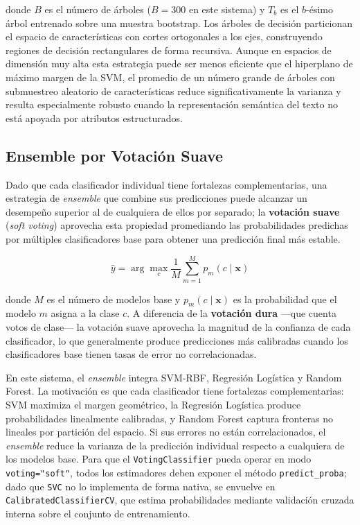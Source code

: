donde $B$ es el número de árboles ($B = 300$ en este sistema) y $T_b$ es el
$b$-ésimo árbol entrenado sobre una muestra bootstrap. Los árboles de decisión
particionan el espacio de características con cortes ortogonales a los ejes,
construyendo regiones de decisión rectangulares de forma recursiva. Aunque en
espacios de dimensión muy alta esta estrategia puede ser menos eficiente que el
hiperplano de máximo margen de la SVM, el promedio de un número grande de árboles
con submuestreo aleatorio de características reduce significativamente la varianza
y resulta especialmente robusto cuando la representación semántica del texto no
está apoyada por atributos estructurados.

\subsection{Ensemble por Votación Suave}

Dado que cada clasificador individual tiene fortalezas complementarias, una
estrategia de \textit{ensemble} que combine sus predicciones puede alcanzar un
desempeño superior al de cualquiera de ellos por separado; la \textbf{votación
suave} (\textit{soft voting}) aprovecha esta propiedad promediando las
probabilidades predichas por múltiples clasificadores base para obtener una
predicción final más estable. \cite{dietterich2000}

\begin{equation}
  \hat{y} = \arg\max_{c} \frac{1}{M} \sum_{m=1}^{M} p_m(c \mid \mathbf{x})
  \label{eq:soft_voting}
\end{equation}

donde $M$ es el número de modelos base y $p_m(c \mid \mathbf{x})$ es la
probabilidad que el modelo $m$ asigna a la clase $c$. A diferencia de la
\textbf{votación dura} —que cuenta votos de clase— la votación suave aprovecha
la magnitud de la confianza de cada clasificador, lo que generalmente produce
predicciones más calibradas cuando los clasificadores base tienen tasas de error
no correlacionadas.

En este sistema, el \textit{ensemble} integra SVM-RBF, Regresión Logística y
Random Forest. La motivación es que cada clasificador tiene fortalezas
complementarias: SVM maximiza el margen geométrico, la Regresión Logística
produce probabilidades linealmente calibradas, y Random Forest captura fronteras
no lineales por partición del espacio. Si sus errores no están correlacionados,
el \textit{ensemble} reduce la varianza de la predicción individual respecto a
cualquiera de los modelos base. Para que el \texttt{VotingClassifier} pueda
operar en modo \texttt{voting="soft"}, todos los estimadores deben exponer el
método \texttt{predict\_proba}; dado que \texttt{SVC} no lo implementa de forma
nativa, se envuelve en \texttt{CalibratedClassifierCV}, que estima probabilidades
mediante validación cruzada interna sobre el conjunto de entrenamiento.


